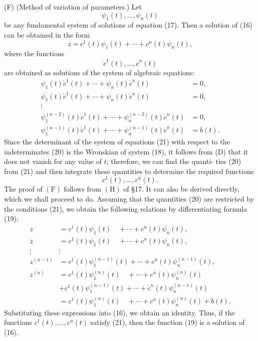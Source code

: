 \documentclass[10pt,a5paper]{book}
\theoremstyle{plain}
\theoremstyle{definition}
\theoremstyle{remark}
\begin{document}
(F) (Method of variation of parameters.) Let
\begin{equation*}
\psi_{1}(t), \ldots, \psi_{n}(t) \tag{18}
\end{equation*}
be any fundamental system of solutions of equation (17). Then a solution of (16) can be obtained in the form
\begin{equation*}
z=c^{1}(t) \psi_{1}(t)+\cdots+c^{n}(t) \psi_{n}(t), \tag{19}
\end{equation*}
where the functions
\begin{equation*}
\dot{c}^{1}(t), \ldots, \dot{c}^{n}(t) \tag{20}
\end{equation*}
are obtained as solutions of the system of algebraic equations:
\[
\begin{array}{cl}
\psi_{1}(t) \dot{c}^{1}(t)+\cdots+\psi_{n}(t) \dot{c}^{n}(t) & =0, \\
\psi_{1}(t) \dot{c}^{1}(t)+\cdots+\psi_{n}(t) \dot{c}^{n}(t) & =0, \\
\vdots &  \tag{21}\\
\psi_{1}^{(n-2)}(t) \dot{c}^{1}(t)+\cdots+\psi_{n}^{(n-2)}(t) \dot{c}^{n}(t) & =0, \\
\psi_{1}^{(n-1)}(t) \dot{c}^{1}(t)+\cdots+\psi_{n}^{(n-1)}(t) \dot{c}^{n}(t) & =b(t) .
\end{array}
\]
Since the determinant of the system of equations (21) with respect to the indeterminates (20) is the Wronskian of system (18), it follows from (D) that it does not vanish for any value of $t$; therefore, we can find the quanti-
ties (20) from (21) and then integrate these quantities to determine the required functions
\[
c^{1}(t), \ldots, c^{n}(t) .
\]
The proof of $(\mathrm{F})$ follows from $(\mathrm{H})$ of §17. It can also be derived directly, which we shall proceed to do. Assuming that the quantities (20) are restricted by the conditions (21), we obtain the following relations by differentiating formula (19):
\[
\begin{aligned}
z & =c^{1}(t) \psi_{1}(t) \quad+\cdots+c^{n}(t) \psi_{n}(t), \\
\dot{z} & =c^{1}(t) \psi_{1}(t) \quad+\cdots+c^{n}(t) \psi_{n}(t), \\
\vdots & \vdots \\
z^{(n-1)} & =c^{1}(t) \psi_{1}^{(n-1)}(t)+\cdots+c^{n}(t) \psi_{n}^{(n-1)}(t), \\
z^{(n)} & =c^{1}(t) \psi_{1}^{(n)}(t) \quad+\cdots+c^{n}(t) \psi_{n}^{(n)}(t) \\
& +c^{1}(t) \psi_{1}^{(n-1)}(t)+\cdots+\dot{c}^{n}(t) \psi_{n}^{(n-1)}(t) \\
& =c^{1}(t) \psi_{1}^{(n)}(t) \quad+\cdots+c^{n}(t) \psi_{n}^{(n)}(t)+b(t) .
\end{aligned}
\]
Substituting these expressions into (16), we obtain an identity. Thus, if the functions $c^{1}(t), \ldots, c^{n}(t)$ satisfy (21), then the function (19) is a solution of (16).
\end{document}
